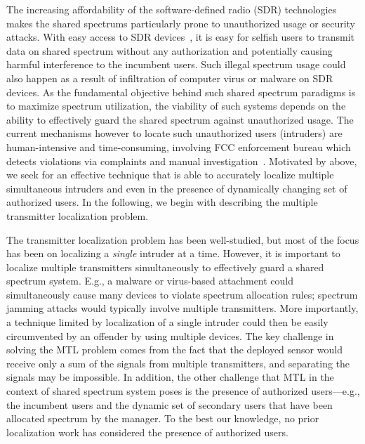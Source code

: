The increasing affordability of the software-defined radio (SDR)
technologies makes the shared spectrums particularly prone to
unauthorized usage or security attacks. With easy access to SDR
devices~\cite{usrp,hackrf}, it is easy for selfish users to transmit data
on shared spectrum without any authorization and potentially causing
harmful interference to the incumbent users.  Such illegal spectrum
usage could also happen as a result of infiltration of computer virus
or malware on SDR devices.  As the fundamental objective behind such
shared spectrum paradigms is to maximize spectrum utilization, the
viability of such systems depends on the ability to effectively guard
the shared spectrum against unauthorized usage.  The current
mechanisms however to locate such unauthorized users (intruders) are
human-intensive and time-consuming, involving FCC enforcement bureau
which detects violations via complaints and manual
investigation~\cite{mobicom17-splot}. 
Motivated by above, we seek for an effective
technique that is able to accurately localize multiple simultaneous
intruders and even in the presence of dynamically changing set of
authorized users. In the following, we begin with describing the multiple transmitter localization problem.


  
 The transmitter localization problem has been well-studied, but most of the focus has been on localizing a {\em single} intruder at a time. However, it is important to localize multiple transmitters simultaneously to effectively guard a shared spectrum
system. E.g., a malware or virus-based attachment could simultaneously cause many devices to violate spectrum allocation rules; spectrum
jamming attacks would typically involve multiple transmitters. More
importantly, a technique limited by localization of a single intruder
could then be easily circumvented by an offender by using multiple
devices.
The key challenge in solving the MTL problem comes from the fact that
the deployed sensor would receive only a sum of the signals from multiple transmitters, and separating the signals may be impossible.  In
addition, the other challenge that MTL in the context of shared
spectrum system poses is the presence of authorized users---e.g., the
incumbent users and the dynamic set of secondary users that have been
allocated spectrum by the manager. To the best our knowledge, no prior
localization work has considered the presence of authorized users.

